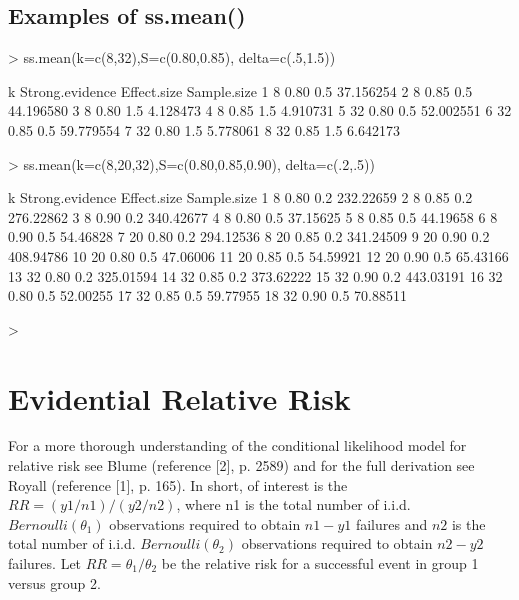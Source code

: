 \documentclass{article}
\begin{document}
\subsection{Examples of ss.mean()}
\begin{Schunk}
\begin{Sinput}
> ss.mean(k=c(8,32),S=c(0.80,0.85), delta=c(.5,1.5))
\end{Sinput}
\begin{Soutput}
   k Strong.evidence Effect.size Sample.size
1  8            0.80         0.5   37.156254
2  8            0.85         0.5   44.196580
3  8            0.80         1.5    4.128473
4  8            0.85         1.5    4.910731
5 32            0.80         0.5   52.002551
6 32            0.85         0.5   59.779554
7 32            0.80         1.5    5.778061
8 32            0.85         1.5    6.642173
\end{Soutput}
\begin{Sinput}
> ss.mean(k=c(8,20,32),S=c(0.80,0.85,0.90), delta=c(.2,.5))
\end{Sinput}
\begin{Soutput}
    k Strong.evidence Effect.size Sample.size
1   8            0.80         0.2   232.22659
2   8            0.85         0.2   276.22862
3   8            0.90         0.2   340.42677
4   8            0.80         0.5    37.15625
5   8            0.85         0.5    44.19658
6   8            0.90         0.5    54.46828
7  20            0.80         0.2   294.12536
8  20            0.85         0.2   341.24509
9  20            0.90         0.2   408.94786
10 20            0.80         0.5    47.06006
11 20            0.85         0.5    54.59921
12 20            0.90         0.5    65.43166
13 32            0.80         0.2   325.01594
14 32            0.85         0.2   373.62222
15 32            0.90         0.2   443.03191
16 32            0.80         0.5    52.00255
17 32            0.85         0.5    59.77955
18 32            0.90         0.5    70.88511
\end{Soutput}
\begin{Sinput}
> 
\end{Sinput}
\end{Schunk}
\section{Evidential Relative Risk}
For a more thorough understanding of the conditional likelihood model for relative risk see Blume (reference [2], p. 2589) and for the full derivation see Royall (reference [1], p. 165).  In short, of interest is the $RR=(y1/n1)/(y2/n2)$, where n1 is the total number of i.i.d. $Bernoulli(\theta_1)$ observations required to obtain $n1-y1$ failures and $n2$ is the total number of i.i.d. $Bernoulli(\theta_2)$ observations required to obtain $n2-y2$ failures. Let $RR = \theta_1/\theta_2$ be the relative risk for a successful event in group 1 versus group 2. 
\end{document}
